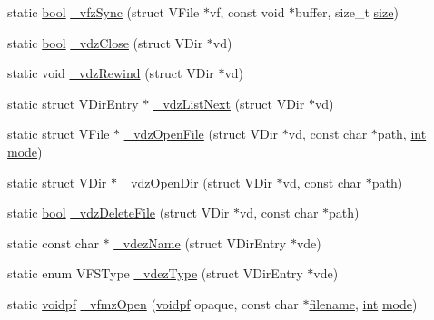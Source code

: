 \begin{DoxyCompactItemize}
static \mbox{\hyperlink{libretro_8h_a4a26dcae73fb7e1528214a068aca317e}{bool}} \mbox{\hyperlink{vfs-zip_8c_ae7abdd2e12cc8754b08365ae7544f052}{\+\_\+vfz\+Sync}} (struct V\+File $\ast$vf, const void $\ast$buffer, size\+\_\+t \mbox{\hyperlink{ioapi_8h_a014d89bd76f74ef3a29c8f04b473eb76}{size}})
\item 
static \mbox{\hyperlink{libretro_8h_a4a26dcae73fb7e1528214a068aca317e}{bool}} \mbox{\hyperlink{vfs-zip_8c_ab0c37e0c87dc08d24f8acda1bd6603c9}{\+\_\+vdz\+Close}} (struct V\+Dir $\ast$vd)
\item 
static void \mbox{\hyperlink{vfs-zip_8c_a01992145dbe331dad189be7ade324a00}{\+\_\+vdz\+Rewind}} (struct V\+Dir $\ast$vd)
\item 
static struct V\+Dir\+Entry $\ast$ \mbox{\hyperlink{vfs-zip_8c_a530f0797de537841abac89088d73e20a}{\+\_\+vdz\+List\+Next}} (struct V\+Dir $\ast$vd)
\item 
static struct V\+File $\ast$ \mbox{\hyperlink{vfs-zip_8c_ac2b71e2008abddb2b5a74914eb8fe458}{\+\_\+vdz\+Open\+File}} (struct V\+Dir $\ast$vd, const char $\ast$path, \mbox{\hyperlink{ioapi_8h_a787fa3cf048117ba7123753c1e74fcd6}{int}} \mbox{\hyperlink{ioapi_8h_a7e43d41c2fe013a373b540cba02505cf}{mode}})
\item 
static struct V\+Dir $\ast$ \mbox{\hyperlink{vfs-zip_8c_a69eab4c663a9a5f03f615134ef62db34}{\+\_\+vdz\+Open\+Dir}} (struct V\+Dir $\ast$vd, const char $\ast$path)
\item 
static \mbox{\hyperlink{libretro_8h_a4a26dcae73fb7e1528214a068aca317e}{bool}} \mbox{\hyperlink{vfs-zip_8c_a05fa3cb4db94757aeccb05240732b2dc}{\+\_\+vdz\+Delete\+File}} (struct V\+Dir $\ast$vd, const char $\ast$path)
\item 
static const char $\ast$ \mbox{\hyperlink{vfs-zip_8c_a8c5eb3d1849f409a7238bee594d0b139}{\+\_\+vdez\+Name}} (struct V\+Dir\+Entry $\ast$vde)
\item 
static enum V\+F\+S\+Type \mbox{\hyperlink{vfs-zip_8c_abefae5482409acabbad9ccb2549f1c35}{\+\_\+vdez\+Type}} (struct V\+Dir\+Entry $\ast$vde)
\item 
static \mbox{\hyperlink{ioapi_8h_a39ab6d73c1cd44bc17064c2dcbb3e753}{voidpf}} \mbox{\hyperlink{vfs-zip_8c_aab51e4c401779a6979ba1574b9f4c714}{\+\_\+vfmz\+Open}} (\mbox{\hyperlink{ioapi_8h_a39ab6d73c1cd44bc17064c2dcbb3e753}{voidpf}} opaque, const char $\ast$\mbox{\hyperlink{ioapi_8h_a2c8e3f833d9ea6f106973ebe4391bf0f}{filename}}, \mbox{\hyperlink{ioapi_8h_a787fa3cf048117ba7123753c1e74fcd6}{int}} \mbox{\hyperlink{ioapi_8h_a7e43d41c2fe013a373b540cba02505cf}{mode}})
\item 

\end{DoxyCompactItemize}
